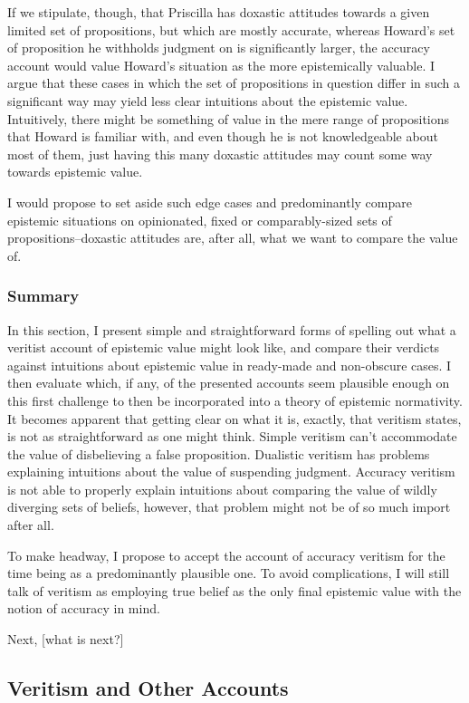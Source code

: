 \documentclass[12pt,numbers=noenddot]{scrartcl}
\begin{document}
If we stipulate, though, that Priscilla has doxastic attitudes towards a given limited set of propositions, but which are mostly accurate, whereas Howard's set of proposition he withholds judgment on is significantly larger, the accuracy account would value Howard's situation as the more epistemically valuable. I argue that these cases in which the set of propositions in question differ in such a significant way may yield less clear intuitions about the epistemic value. Intuitively, there might be something of value in the mere range of propositions that Howard is familiar with, and even though he is not knowledgeable about most of them, just having this many doxastic attitudes may count some way towards epistemic value.

I would propose to set aside such edge cases and predominantly compare epistemic situations on opinionated, fixed or comparably-sized sets of propositions–doxastic attitudes are, after all, what we want to compare the value of.

\subsubsection{Summary}

In this section, I present simple and straightforward forms of spelling out what a veritist account of epistemic value might look like, and compare their verdicts against intuitions about epistemic value in ready-made and non-obscure cases. I then evaluate which, if any, of the presented accounts seem plausible enough on this first challenge to then be incorporated into a theory of epistemic normativity. It becomes apparent that getting clear on what it is, exactly, that veritism states, is not as straightforward as one might think. Simple veritism can't accommodate the value of disbelieving a false proposition. Dualistic veritism has problems explaining intuitions about the value of suspending judgment. Accuracy veritism is not able to properly explain intuitions about comparing the value of wildly diverging sets of beliefs, however, that problem might not be of so much import after all.

To make headway, I propose to accept the account of accuracy veritism for the time being as a predominantly plausible one. To avoid complications, I will still talk of veritism as employing true belief as the only final epistemic value with the notion of accuracy in mind.

Next, [what is next?]

\subsection{Veritism and Other Accounts}
\end{document}
